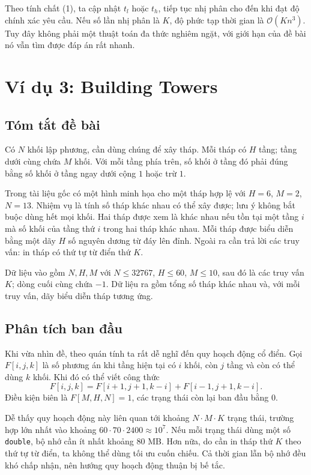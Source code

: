 \documentclass[11pt]{article}
\newcommand{\Oh}{\mathcal{O}}
\begin{document}
Theo tính chất (1), ta cập nhật $t_l$ hoặc $t_h$, tiếp tục nhị phân cho đến
khi đạt độ chính xác yêu cầu. Nếu số lần nhị phân là $K$, độ phức tạp thời
gian là $\Oh(Kn^3)$. Tuy đây không phải một thuật toán đa thức nghiêm ngặt,
với giới hạn của đề bài nó vẫn tìm được đáp án rất nhanh.

\section{Ví dụ 3: Building Towers}

\subsection{Tóm tắt đề bài}

Có $N$ khối lập phương, cần dùng chúng để xây tháp. Mỗi tháp có $H$ tầng; tầng
dưới cùng chứa $M$ khối. Với mỗi tầng phía trên, số khối ở tầng đó phải đúng
bằng số khối ở tầng ngay dưới cộng $1$ hoặc trừ $1$.

Trong tài liệu gốc có một hình minh họa cho một tháp hợp lệ với
$H=6$, $M=2$, $N=13$. Nhiệm vụ là tính số tháp khác nhau có thể xây được; lưu
ý không bắt buộc dùng hết mọi khối. Hai tháp được xem là khác nhau nếu tồn
tại một tầng $i$ mà số khối của tầng thứ $i$ trong hai tháp khác nhau. Mỗi
tháp được biểu diễn bằng một dãy $H$ số nguyên dương từ đáy lên đỉnh. Ngoài
ra cần trả lời các truy vấn: in tháp có thứ tự từ điển thứ $K$.

Dữ liệu vào gồm $N,H,M$ với $N\le 32767$, $H\le 60$, $M\le 10$, sau đó là các
truy vấn $K$; dòng cuối cùng chứa $-1$. Dữ liệu ra gồm tổng số tháp khác nhau
và, với mỗi truy vấn, dãy biểu diễn tháp tương ứng.

\subsection{Phân tích ban đầu}

Khi vừa nhìn đề, theo quán tính ta rất dễ nghĩ đến quy hoạch động cổ điển.
Gọi $F[i,j,k]$ là số phương án khi tầng hiện tại có $i$ khối, còn $j$ tầng và
còn có thể dùng $k$ khối. Khi đó có thể viết công thức
\[
  F[i,j,k]=F[i+1,j+1,k-i]+F[i-1,j+1,k-i].
\]
Điều kiện biên là $F[M,H,N]=1$, các trạng thái còn lại ban đầu bằng $0$.

Dễ thấy quy hoạch động này liên quan tới khoảng $N\cdot M\cdot K$ trạng thái,
trường hợp lớn nhất vào khoảng $60\cdot 70\cdot 2400\approx 10^7$. Nếu mỗi
trạng thái dùng một số \texttt{double}, bộ nhớ cần ít nhất khoảng $80$ MB.
Hơn nữa, do cần in tháp thứ $K$ theo thứ tự từ điển, ta không thể dùng tối ưu
cuốn chiếu. Cả thời gian lẫn bộ nhớ đều khó chấp nhận, nên hướng quy hoạch
động thuận bị bế tắc.
\end{document}
